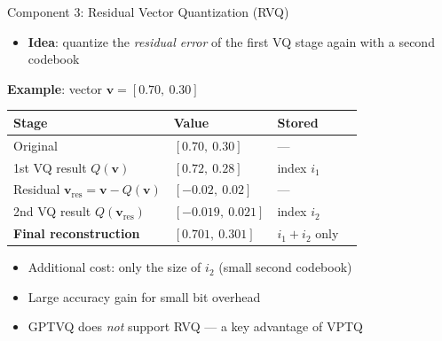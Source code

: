 \begin{frame}{Component 3: Residual Vector Quantization (RVQ)}
  \begin{itemize}
    \item \textbf{Idea}: quantize the \emph{residual error} of the first VQ stage again with a second codebook
  \end{itemize}
  \vspace{0.3em}
  \textbf{Example}: vector $\mathbf{v} = [0.70,\ 0.30]$

  \vspace{0.3em}
  \begin{center}
    \begin{tabular}{llll}
      \toprule
      Stage & Value & Stored & \\
      \midrule
      Original & $[0.70,\ 0.30]$ & --- & \\
      1st VQ result $Q(\mathbf{v})$ & $[0.72,\ 0.28]$ & index $i_1$ & \\
      Residual $\mathbf{v}_{\text{res}} = \mathbf{v} - Q(\mathbf{v})$ & $[-0.02,\ 0.02]$ & --- & \\
      2nd VQ result $Q(\mathbf{v}_{\text{res}})$ & $[-0.019,\ 0.021]$ & index $i_2$ & \\
      \midrule
      \textbf{Final reconstruction} & $[0.701,\ 0.301]$ & $i_1 + i_2$ only & \\
      \bottomrule
    \end{tabular}
  \end{center}
  \vspace{0.3em}
  \begin{itemize}
    \item Additional cost: only the size of $i_2$ (small second codebook)
    \item Large accuracy gain for small bit overhead
    \item GPTVQ does \emph{not} support RVQ --- a key advantage of VPTQ
  \end{itemize}
\end{frame}

